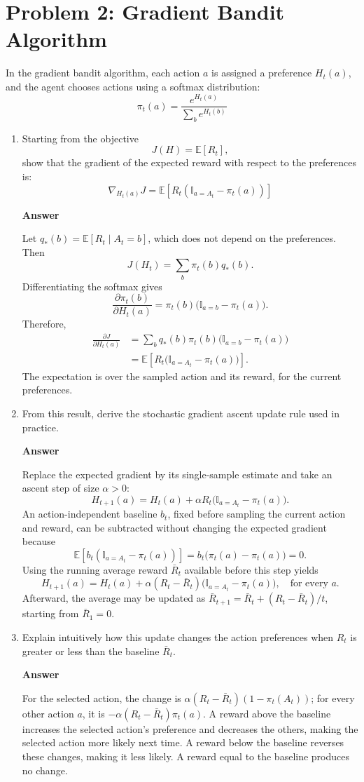 \documentclass[11pt,a4paper]{article}
\newcommand{\answer}{\par\smallskip\textbf{Answer}\par}
\begin{document}
\newpage
\section{Problem 2: Gradient Bandit Algorithm}
In the gradient bandit algorithm, each action $a$ is assigned a preference $H_t(a)$, and the agent chooses actions using a softmax distribution:
\[
\pi_t(a)=\frac{e^{H_t(a)}}{\sum_b e^{H_t(b)}}
\]
\begin{enumerate}
\item Starting from the objective
\[
J(H)=\mathbb{E}[R_t],
\]
show that the gradient of the expected reward with respect to the preferences is:
\[
\nabla_{H_t(a)}J=\mathbb{E}[R_t(\mathbb{I}_{a=A_t}-\pi_t(a))]
\]
\answer
Let $q_*(b)=\mathbb{E}[R_t\mid A_t=b]$, which does not depend on the preferences. Then
\[
J(H_t)=\sum_b\pi_t(b)q_*(b).
\]
Differentiating the softmax gives
\[
\frac{\partial\pi_t(b)}{\partial H_t(a)}
=\pi_t(b)\bigl(\mathbb{I}_{a=b}-\pi_t(a)\bigr).
\]
Therefore,
\begin{align*}
\frac{\partial J}{\partial H_t(a)}
&=\sum_b q_*(b)\pi_t(b)\bigl(\mathbb{I}_{a=b}-\pi_t(a)\bigr)\\
&=\mathbb{E}\!\left[R_t\bigl(\mathbb{I}_{a=A_t}-\pi_t(a)\bigr)\right].
\end{align*}
The expectation is over the sampled action and its reward, for the current preferences.

\item From this result, derive the stochastic gradient ascent update rule used in practice.
\answer
Replace the expected gradient by its single-sample estimate and take an ascent step of size $\alpha>0$:
\[
H_{t+1}(a)=H_t(a)+\alpha R_t\bigl(\mathbb{I}_{a=A_t}-\pi_t(a)\bigr).
\]
An action-independent baseline $b_t$, fixed before sampling the current action and reward, can be subtracted without changing the expected gradient because
\[
\mathbb{E}\!\left[b_t(\mathbb{I}_{a=A_t}-\pi_t(a))\right]
=b_t\bigl(\pi_t(a)-\pi_t(a)\bigr)=0.
\]
Using the running average reward $\bar R_t$ available before this step yields
\[
\boxed{H_{t+1}(a)=H_t(a)+\alpha(R_t-\bar R_t)
\bigl(\mathbb{I}_{a=A_t}-\pi_t(a)\bigr),\quad\text{for every }a.}
\]
Afterward, the average may be updated as
$\bar R_{t+1}=\bar R_t+(R_t-\bar R_t)/t$, starting from $\bar R_1=0$.

\item Explain intuitively how this update changes the action preferences when $R_t$ is greater or less than the baseline $\bar R_t$.
\answer
For the selected action, the change is $\alpha(R_t-\bar R_t)(1-\pi_t(A_t))$; for every other action $a$, it is $-\alpha(R_t-\bar R_t)\pi_t(a)$. A reward above the baseline increases the selected action's preference and decreases the others, making the selected action more likely next time. A reward below the baseline reverses these changes, making it less likely. A reward equal to the baseline produces no change.
\end{enumerate}
\end{document}
